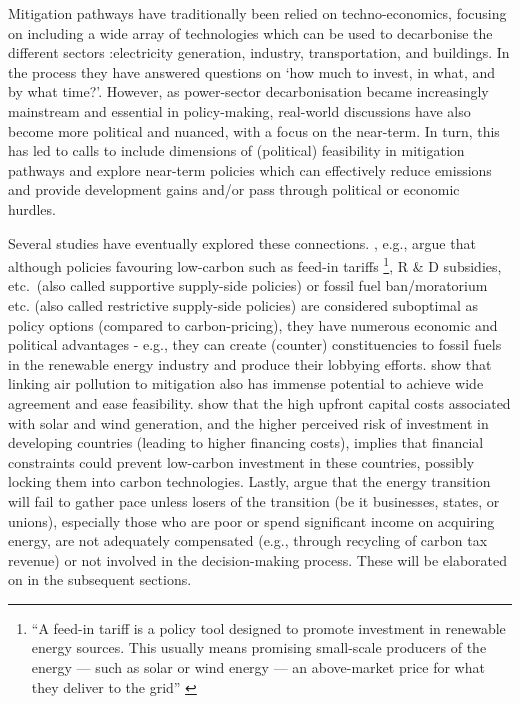\documentclass[../thesis.tex]{subfiles}
\begin{document}
Mitigation pathways have traditionally been relied on techno-economics, focusing on including a wide array of technologies which can be used to decarbonise the different sectors :electricity generation, industry, transportation, and buildings.  In the process they have answered questions on `how much to invest, in what, and by what time?'. However, as power-sector decarbonisation became increasingly mainstream and essential in policy-making, real-world discussions have also become more political and nuanced, with a focus on the near-term. In turn, this has led to calls to include dimensions of (political) feasibility in mitigation pathways \citep{anderson2019} and explore near-term policies which can effectively reduce emissions and provide development gains and/or pass through political or economic hurdles.

Several studies have eventually explored these connections. \citet{pahle2018a,meckling2015winning,green2018cutting},  e.g., argue that although policies favouring low-carbon such as feed-in tariffs \footnote{``A feed-in tariff is a policy tool designed to promote investment in renewable energy sources. This usually means promising small-scale producers of the energy — such as solar or wind energy — an above-market price for what they deliver to the grid'' \citep{willkenton2021}}, R \& D subsidies, etc.\ (also called supportive supply-side policies) or fossil fuel ban/moratorium etc. (also called restrictive supply-side policies) are considered suboptimal as policy options (compared to carbon-pricing), they have numerous economic and political advantages - e.g., they can create (counter) constituencies to fossil fuels in the renewable energy industry and produce their lobbying efforts. \citet{rauner2020,west2013} show that linking air pollution to mitigation also has immense potential to achieve wide agreement and ease feasibility.  show that the high upfront capital costs associated with solar and wind generation, and the higher perceived risk of investment in developing countries (leading to higher financing costs), implies that financial constraints could prevent low-carbon investment in these countries, possibly locking them into carbon technologies. Lastly, \citet{mccauley2018,healy2017} argue that the energy transition will fail to gather pace unless losers of the transition (be it businesses, states, or unions), especially those who are poor or spend significant income on acquiring energy, are not adequately compensated (e.g., through recycling of carbon tax revenue) or not involved in the decision-making process. These will be elaborated on in the subsequent sections.
\end{document}
